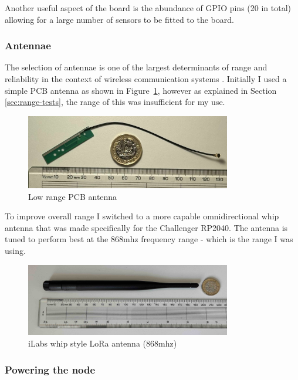 Another useful aspect of the board is the abundance of GPIO pins (20 in total)
allowing for a large number of sensors to be fitted to the board.

\subsubsection{Antennae}

The selection of antennae is one of the largest determinants of range and
reliability in the context of wireless communication systems \cite{khan2016}.
Initially I used a simple PCB antenna as shown in Figure~\ref{fig:pcb-antenna},
however as explained in Section \ref{sec:range-tests}, the range of this was
insufficient for my use.

\begin{figure}[H]
    \centering
    \includegraphics[width=0.8\textwidth]{contents/part-2/fig2/basic-antenna.jpg}
    \caption{Low range PCB antenna}
    \label{fig:pcb-antenna}
\end{figure}

To improve overall range I switched to a more capable omnidirectional whip
antenna that was made specifically for the Challenger RP2040. The antenna is
tuned to perform best at the 868mhz frequency range - which is the range I was
using.

\begin{figure}[H]
    \centering
    \includegraphics[width=0.8\textwidth]{contents/part-2/fig2/good-antenna.jpg}
    \caption{iLabs whip style LoRa antenna (868mhz)}
    \label{fig:good-antenna}
\end{figure}

\subsubsection{Powering the node}

